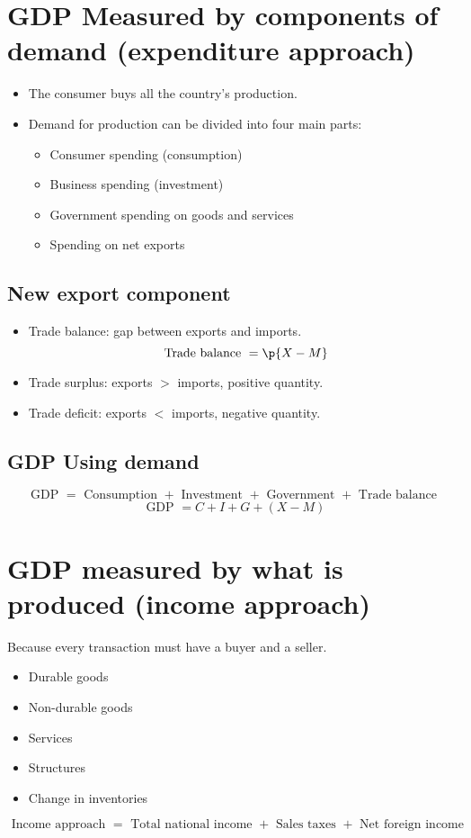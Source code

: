 \documentclass[openany]{book}
\begin{document}
\section{GDP Measured by components of demand (expenditure approach)}
\begin{itemize}
    \item The consumer buys all the country's production.
    \item Demand for production can be divided into four main parts: 
        \begin{itemize}
            \item Consumer spending (consumption)
            \item Business spending (investment)
            \item Government spending on goods and services
            \item Spending on net exports 
        \end{itemize}
\end{itemize}

\subsection{New export component}
\begin{itemize}
    \item Trade balance: gap between exports and imports.
        \[
            \text{ Trade balance } = \p{X - M} 
        \]
    \item Trade surplus: exports $>$ imports, positive quantity. 
    \item Trade deficit: exports $<$ imports, negative quantity. 
\end{itemize}

\subsection{GDP Using demand}
\[
  \text{ GDP } = \text{ Consumption } + \text{ Investment } + \text{ Government } + \text{ Trade balance }
\]
\[
  \text{ GDP } = C + I + G + (X-M)
\]


\section{GDP measured by what is produced (income approach)}
Because every transaction must have a buyer and a seller. 
\begin{itemize}
    \item Durable goods 
    \item Non-durable goods
    \item Services 
    \item Structures 
    \item Change in inventories 
\end{itemize}
\[
  \text{ Income approach } = \text{ Total national income } + \text{ Sales taxes } + \text{ Net foreign income }
\]
\end{document}
